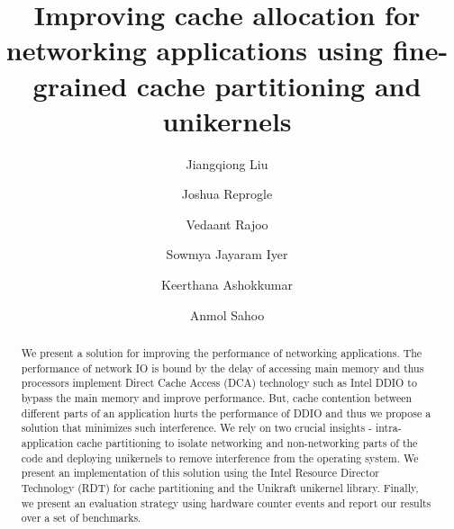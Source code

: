 \documentclass[sigconf,authorversion,noacm]{acmart}
\begin{document}
\title{Improving cache allocation for networking applications using fine-grained
cache partitioning and unikernels}

\author{Jiangqiong Liu}

\author{Joshua Reprogle}

\author{Vedaant Rajoo}

\author{Sowmya Jayaram Iyer}

\author{Keerthana Ashokkumar}

\author{Anmol Sahoo}

\renewcommand{\shortauthors}{Liu et al.}

\begin{abstract}
    We present a solution for improving the performance of networking
    applications. The performance of network IO is bound by the delay of
    accessing main memory and thus processors implement Direct Cache Access
    (DCA) technology such as Intel DDIO to bypass the main memory and improve
    performance. But, cache contention between different parts of an application
    hurts the performance of DDIO and thus we propose a solution that minimizes
    such interference. We rely on two crucial insights - intra-application cache
    partitioning to isolate networking and non-networking parts of the code and
    deploying unikernels to remove interference from the operating system. We
    present an implementation of this solution using the Intel Resource Director
    Technology (RDT) for cache partitioning and the Unikraft unikernel library.
    Finally, we present an evaluation strategy using hardware counter events and
    report our results over a set of benchmarks.
\end{abstract}
\end{document}
